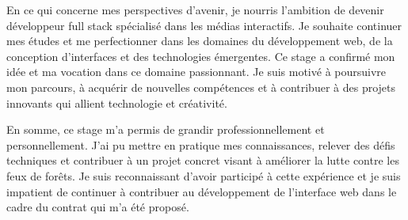 En ce qui concerne mes perspectives d'avenir, je nourris l'ambition de devenir développeur full stack spécialisé dans les médias interactifs. Je souhaite continuer mes études et me perfectionner dans les domaines du développement web, de la conception d'interfaces et des technologies émergentes. Ce stage a confirmé mon idée et ma vocation dans ce domaine passionnant. Je suis motivé à poursuivre mon parcours, à acquérir de nouvelles compétences et à contribuer à des projets innovants qui allient technologie et créativité.

En somme, ce stage m'a permis de grandir professionnellement et personnellement. J'ai pu mettre en pratique mes connaissances, relever des défis techniques et contribuer à un projet concret visant à améliorer la lutte contre les feux de forêts. Je suis reconnaissant d'avoir participé à cette expérience et je suis impatient de continuer à contribuer au développement de l'interface web dans le cadre du contrat qui m'a été proposé.
